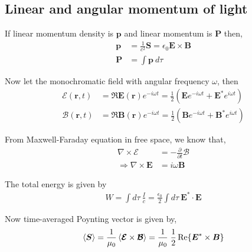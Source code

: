 \documentclass[11pt,a4paper]{article}
\numberwithin{equation}{section}
\begin{document}
\subsection{Linear and angular momentum of light}
If linear momentum density is $\boldsymbol{p}$ and linear momentum is $\boldsymbol{P}$ then,
\begin{align}
	\boldsymbol{p} &= \frac{1}{c^2}\boldsymbol{S} = \epsilon_0 \boldsymbol{E} \times \boldsymbol{B}\label{eq:3.1}\\
	\boldsymbol{P} &= \int \boldsymbol{p} \:d\tau \label{eq:3.2}
\end{align}

Now let the monochromatic field with angular frequency $\omega$, then
\begin{align}
	\boldsymbol{\mathcal{E}}(\boldsymbol{r},t) &= \Re{\boldsymbol{E}(\boldsymbol{r}) e^{-i \omega t }} = \frac{1}{2}(\boldsymbol{E} e^{-i \omega t } +\boldsymbol{E}^\ast e^{i \omega t})\\
	\boldsymbol{\mathcal{B}}(\boldsymbol{r},t) &= \Re{\boldsymbol{B}(\boldsymbol{r}) e^{-i \omega t }} = \frac{1}{2}(\boldsymbol{B} e^{-i \omega t } +\boldsymbol{B}^\ast e^{i \omega t})
\end{align}

From Maxwell-Faraday equation in free space, we know that, \cite{haus}
\begin{align}
	\nabla\times\boldsymbol{\mathcal{E}}&= - \frac{\partial}{\partial t}\boldsymbol{\mathcal{B}}\\
	\Rightarrow \nabla\times\boldsymbol{E}&= i\omega \boldsymbol{B} \label{eq:3.6}
\end{align}

The total energy is given by
\begin{align}
	W = \int d\tau\: \frac{I}{c}=\frac{\epsilon_0}{2}\int d\tau\: \boldsymbol{E}^\ast\cdot\boldsymbol{E}
\end{align}

Now time-averaged Poynting vector is given by, \cite{poynting}\cite{haus}
\begin{align}
	\expval{\boldsymbol{S}} =\frac{1}{\mu_0}\expval{\boldsymbol{\mathcal{E}} \times \boldsymbol{\mathcal{B}}} =\frac{1}{\mu_0}\; \frac{1}{2} \Re{\boldsymbol{E}^\ast \times \boldsymbol{B}} \label{eq:3.8}
\end{align}
\end{document}
